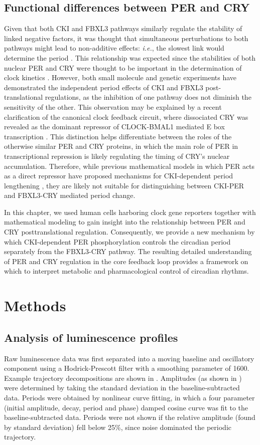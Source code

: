 \subsection{Functional differences between PER and CRY}
Given that both CKI and FBXL3 pathways similarly regulate the stability of linked negative factors, it was thought that simultaneous perturbations to both pathways might lead to non-additive effects: {\it i.e.}, the slowest link would determine the period \cite{Maywood2011}. 
This relationship was expected since the stabilities of both nuclear PER and CRY were thought to be important in the determination of clock kinetics \cite{Meng2008, Hirota2012}. 
However, both small molecule \cite{Hirota2012} and genetic experiments \cite{Maywood2011} have demonstrated the independent period effects of CKI and FBXL3 post-translational regulations, as the inhibition of one pathway does not diminish the sensitivity of the other. 
This observation may be explained by a recent clarification of the canonical clock feedback circuit, where dissociated CRY was revealed as the dominant repressor of CLOCK-BMAL1 mediated E box transcription \cite{Ye2011}. 
 This distinction helps differentiate between the roles of the otherwise similar PER and CRY proteins, in which the main role of PER in transcriptional repression is likely regulating the timing of CRY's nuclear accumulation. 
 Therefore, while previous mathematical models in which PER acts as a direct repressor have proposed mechanisms for CKI-dependent period lengthening \cite{Gallego2006, Vanselow2006}, they are likely not suitable for distinguishing between CKI-PER and FBXL3-CRY mediated period change.

In this chapter, we used human cells harboring clock gene reporters together with mathematical modeling to gain insight into the relationship between PER and CRY posttranslational regulation. 
Consequently, we provide a new mechanism by which CKI-dependent PER phosphorylation controls the circadian period separately from the FBXL3-CRY pathway. 
The resulting detailed understanding of PER and CRY regulation in the core feedback loop provides a framework on which to interpret metabolic and pharmacological control of circadian rhythms.

\section{Methods}
\subsection{Analysis of luminescence profiles}
Raw luminescence data was first separated into a moving baseline and oscillatory component using a Hodrick-Prescott filter with a smoothing parameter of 1600. 
Example trajectory decompositions are shown in . 
Amplitudes (as shown in ) were determined by taking the standard deviation in the baseline-subtracted data. 
Periods were obtained by nonlinear curve fitting, in which a four parameter (initial amplitude, decay, period and phase) damped cosine curve was fit to the baseline-subtracted data. 
Periods were not shown if the relative amplitude (found by standard deviation) fell below 25\%, since noise dominated the periodic trajectory. 

